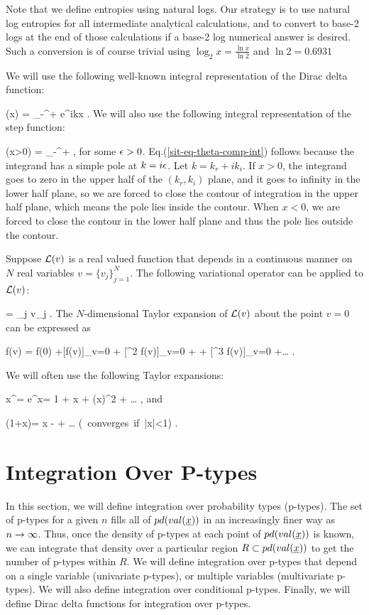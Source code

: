 Note that we
define entropies
using natural logs. Our
strategy is to
use natural log entropies
for all intermediate analytical
calculations, and to
convert
to base-2 logs
at the end of those
calculations if
a base-2 log numerical answer
is desired. Such a conversion is
of course trivial
using $\log_2 x = \frac{\ln x}{\ln 2}$ and
$\ln 2 = 0.6931$


We  will use
the following well-known integral representation
of the Dirac delta function:

\beq
\delta(x) =
\int_{-\infty}^{+\infty}
\;\;  e^{ikx}
\;.
\eeq
We will also use the following
 integral
representation
of the step function:

\beq
\theta(x>0) =
\int_{-\infty}^{+\infty}
\;\;
\;,\label{sit-eq-theta-comp-int}
\eeq
for some $\epsilon>0$.
Eq.(\ref{sit-eq-theta-comp-int})
follows
because the integrand
has a simple pole at $k=i\epsilon$.
Let $k = k_r + i k_i$.
If $x>0$,
the integrand goes to zero
in the upper
half of the $(k_r,k_i)$ plane,
and it goes to infinity
in the lower half plane, so we
are forced to close the contour
of integration in the upper half plane,
which means the pole lies inside the contour.
When $x<0$,
we are forced to close the contour in the lower
half plane and thus the pole lies outside
the contour.

Suppose ${\cal L}(v)$
is a real valued
function
that depends in a continuous
manner on $N$
real variables $v=\{v_j\}_{j=1}^N$.
The following variational
operator can be applied to ${\cal L}(v)$:

\beq
\delta= \sum_j \delta v_j
\;.
\eeq
The $N$-dimensional Taylor
expansion of ${\cal L}(v)$
about the point $v=0$ can be expressed as

\beq
f(v) = f(0) +[\delta f(v)]_{v=0} +
[\delta^2 f(v)]_{v=0} + +
[\delta^3 f(v)]_{v=0} +\ldots
\;.
\eeq



We will often use the following
Taylor expansions:

\beq
x^\eps = e^{\eps\ln x}= 1 + \eps \ln x +
(\eps \ln x)^2 + \ldots
\;,
\label{sit-eq-taylor-one}
\eeq
and

\beq
\ln(1+x)= x -  + \ldots
\; (\mbox{ converges if }|x|<1)
\;.
\label{sit-eq-taylor-two}
\eeq




\section{Integration Over P-types}
In this section, we will define
integration over probability types (p-types).
The set of p-types for a
given $n$
fills all of
$pd(val(\rvx))$
in an increasingly
finer way as $n\rightarrow \infty$. Thus, once
the density
of p-types at
each
point of $pd(val(\rvx))$ is known,
we can integrate that density
 over
a particular region $R\subset pd(val(\rvx))$
to get the
number of p-types
within $R$.
We will define
integration over p-types
that depend on a single
variable (univariate p-types),
or multiple variables (multivariate p-types).
We will also define integration over
conditional p-types.
Finally, we will define Dirac
delta functions for integration
over p-types.


